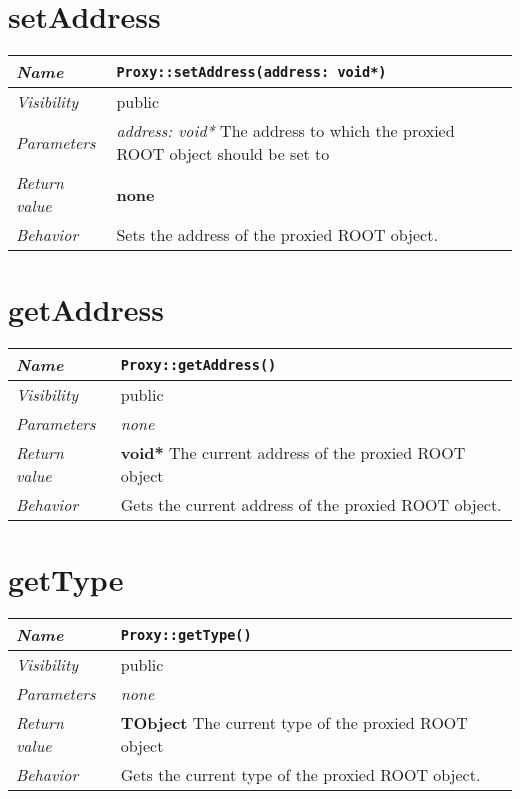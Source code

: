  \section{setAddress}
\begin{longtable}{p{3cm} @{\hskip 1cm} p{12cm}}
 \hline
\textit{Name} & \texttt{Proxy::setAddress(address: void*)}\\
\hline
 \textit{Visibility} & public\\
\hline
\textit{Parameters} & \textit{address: void*} The address to which the proxied ROOT object should be set to \\
\hline
\textit{Return value} & \textbf{none}\\
  \hline
 \textit{Behavior} & Sets the address of the proxied ROOT object. \\
\hline
\end{longtable} \pagebreak
 \section{getAddress}
\begin{longtable}{p{3cm} @{\hskip 1cm} p{12cm}}
 \hline
\textit{Name} & \texttt{Proxy::getAddress()}\\
\hline
 \textit{Visibility} & public\\
\hline
\textit{Parameters} & \textit{none}\\
\hline
\textit{Return value} & \textbf{void*} The current address of the proxied ROOT object \\
  \hline
 \textit{Behavior} & Gets the current address of the proxied ROOT object. \\
\hline
\end{longtable}
 \section{getType}
\begin{longtable}{p{3cm} @{\hskip 1cm} p{12cm}}
 \hline
\textit{Name} & \texttt{Proxy::getType()}\\
\hline
 \textit{Visibility} & public\\
\hline
\textit{Parameters} & \textit{none}\\
\hline
\textit{Return value} & \textbf{TObject} The current type of the proxied ROOT object \\
  \hline
 \textit{Behavior} & Gets the current type of the proxied ROOT object. \\
\hline
\end{longtable}
